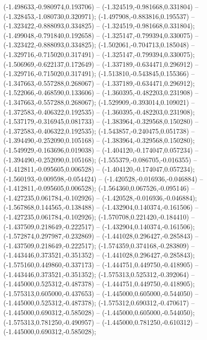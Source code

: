 (-1.498633,-0.980974,0.193706) -- (-1.324519,-0.981668,0.331804) -- (-1.328453,-1.080730,0.320971);
 (-1.497908,-0.883816,0.195537) -- (-1.323422,-0.888093,0.334825) -- (-1.324519,-0.981668,0.331804);
 (-1.499048,-0.791840,0.192658) -- (-1.325147,-0.799394,0.330075) -- (-1.323422,-0.888093,0.334825);
 (-1.502061,-0.704713,0.185048) -- (-1.329716,-0.715020,0.317491) -- (-1.325147,-0.799394,0.330075);
 (-1.506969,-0.622137,0.172649) -- (-1.337189,-0.634471,0.296912) -- (-1.329716,-0.715020,0.317491);
 (-1.513810,-0.543845,0.155366) -- (-1.347663,-0.557288,0.268067) -- (-1.337189,-0.634471,0.296912);
 (-1.522066,-0.468590,0.133606) -- (-1.360395,-0.482203,0.231908) -- (-1.347663,-0.557288,0.268067);
 (-1.529909,-0.393014,0.109021) -- (-1.372583,-0.406322,0.192535) -- (-1.360395,-0.482203,0.231908);
 (-1.537179,-0.316945,0.081733) -- (-1.383964,-0.329568,0.150280) -- (-1.372583,-0.406322,0.192535);
 (-1.543857,-0.240475,0.051738) -- (-1.394490,-0.252090,0.105168) -- (-1.383964,-0.329568,0.150280);
 (-1.549929,-0.163696,0.019038) -- (-1.404120,-0.174047,0.057234) -- (-1.394490,-0.252090,0.105168);
 (-1.555379,-0.086705,-0.016355) -- (-1.412811,-0.095605,0.006528) -- (-1.404120,-0.174047,0.057234);
 (-1.560193,-0.009598,-0.054424) -- (-1.420528,-0.016936,-0.046884) -- (-1.412811,-0.095605,0.006528);
 (-1.564360,0.067526,-0.095146) -- (-1.427235,0.061784,-0.102926) -- (-1.420528,-0.016936,-0.046884);
 (-1.567868,0.144565,-0.138488) -- (-1.432904,0.140374,-0.161506) -- (-1.427235,0.061784,-0.102926);
 (-1.570708,0.221420,-0.184410) -- (-1.437509,0.218649,-0.222517) -- (-1.432904,0.140374,-0.161506);
 (-1.572874,0.297987,-0.232869) -- (-1.441028,0.296427,-0.285843) -- (-1.437509,0.218649,-0.222517);
 (-1.574359,0.374168,-0.283809) -- (-1.443446,0.373521,-0.351352) -- (-1.441028,0.296427,-0.285843);
 (-1.575160,0.449860,-0.337173) -- (-1.444751,0.449750,-0.418905) -- (-1.443446,0.373521,-0.351352);
 (-1.575313,0.525312,-0.392064) -- (-1.445000,0.525312,-0.487378) -- (-1.444751,0.449750,-0.418905);
 (-1.575313,0.605000,-0.437653) -- (-1.445000,0.605000,-0.544050) -- (-1.445000,0.525312,-0.487378);
 (-1.575312,0.690312,-0.470617) -- (-1.445000,0.690312,-0.585028) -- (-1.445000,0.605000,-0.544050);
 (-1.575313,0.781250,-0.490957) -- (-1.445000,0.781250,-0.610312) -- (-1.445000,0.690312,-0.585028);
